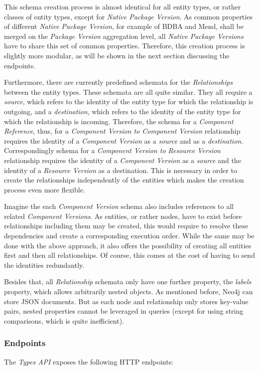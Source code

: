 This schema creation process is almost identical for all entity types, or rather classes of entity types, except for \emph{Native Package Version}. As common properties of different \emph{Native Package Version}, for example of BDBA and Mend, shall be merged on the \emph{Package Version} aggregation level, all \emph{Native Package Versions} have to share this set of common properties. Therefore, this creation process is slightly more modular, as will be shown in the next section discussing the endpoints.\par
Furthermore, there are currently predefined schemata for the \emph{Relationships} between the entity types. These schemata are all quite similar. They all require a \emph{source}, which refers to the identity of the entity type for which the relationship is outgoing, and a \emph{destination}, which refers to the identity of the entity type for which the relationship is incoming. Therefore, the schema for a \emph{Component Reference}, thus, for a \emph{Component Version to Component Version} relationship requires the identity of a \emph{Component Version} as a \emph{source} and as a \emph{destination}. Correspondingly schema for a \emph{Component Version to Resource Version} relationship requires the identity of a \emph{Component Version} as a \emph{source} and the identity of a \emph{Resource Version} as a destination. This is necessary in order to create the relationships independently of the entities which makes the creation process even more flexible.\par 
Imagine the each \emph{Component Version} schema also includes references to all related \emph{Component Versions}. As entities, or rather nodes, have to exist before relationships including them may be created, this would require to resolve these dependencies and create a corresponding execution order. While the same may be done with the above approach, it also offers the possibility of creating all entities first and then all relationships. Of course, this comes at the cost of having to send the identities redundantly.\par 
Besides that, all \emph{Relationship} schemata only have one further property, the \emph{labels} property, which allows arbitrarily nested objects. As mentioned before, Neo4j can store JSON documents. But as each node and relationship only stores key-value pairs, nested properties cannot be leveraged in queries (except for using string comparisons, which is quite inefficient).

\subsubsection{Endpoints}
The \emph{Types API} exposes the following HTTP endpoints:


